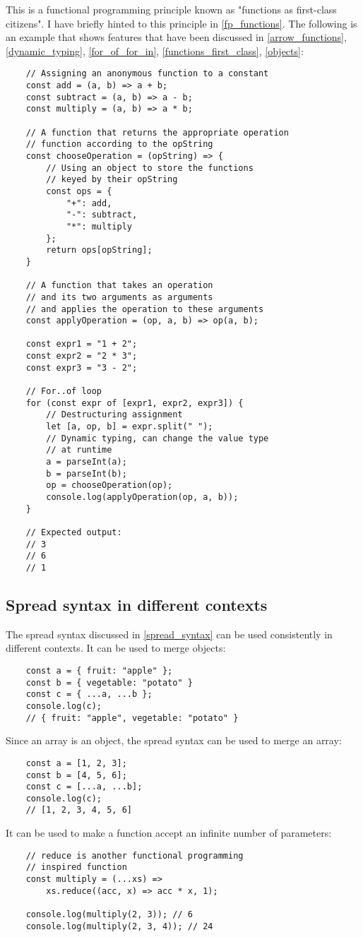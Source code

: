 \documentclass[11pt,a4paper]{article}
\begin{document}
This is a functional programming principle known as "functions as first-class citizens".
I have briefly hinted to this principle in \ref{fp_functions}.
The following is an example that shows features that have been discussed in
\ref{arrow_functions}, \ref{dynamic_typing}, \ref{for_of_for_in}, \ref{functions_first_class}, \ref{objects}:
\begin{verbatim}
    // Assigning an anonymous function to a constant
    const add = (a, b) => a + b;
    const subtract = (a, b) => a - b;
    const multiply = (a, b) => a * b;

    // A function that returns the appropriate operation
    // function according to the opString
    const chooseOperation = (opString) => {
        // Using an object to store the functions
        // keyed by their opString
        const ops = {
            "+": add,
            "-": subtract,
            "*": multiply
        };
        return ops[opString];
    }

    // A function that takes an operation
    // and its two arguments as arguments
    // and applies the operation to these arguments
    const applyOperation = (op, a, b) => op(a, b);

    const expr1 = "1 + 2";
    const expr2 = "2 * 3";
    const expr3 = "3 - 2";

    // For..of loop
    for (const expr of [expr1, expr2, expr3]) {
        // Destructuring assignment
        let [a, op, b] = expr.split(" ");
        // Dynamic typing, can change the value type
        // at runtime
        a = parseInt(a);
        b = parseInt(b);
        op = chooseOperation(op);
        console.log(applyOperation(op, a, b));
    }

    // Expected output:
    // 3
    // 6
    // 1
\end{verbatim}

\subsection{Spread syntax in different contexts}
The spread syntax discussed in \ref{spread_syntax} can be used consistently in different contexts.
It can be used to merge objects:
\begin{verbatim}
    const a = { fruit: "apple" };
    const b = { vegetable: "potato" }
    const c = { ...a, ...b };
    console.log(c);
    // { fruit: "apple", vegetable: "potato" }
\end{verbatim}
Since an array is an object, the spread syntax can be used to merge an array:
\begin{verbatim}
    const a = [1, 2, 3];
    const b = [4, 5, 6];
    const c = [...a, ...b];
    console.log(c);
    // [1, 2, 3, 4, 5, 6]
\end{verbatim}
It can be used to make a function accept an infinite number of parameters:
\begin{verbatim}
    // reduce is another functional programming
    // inspired function
    const multiply = (...xs) =>
        xs.reduce((acc, x) => acc * x, 1);

    console.log(multiply(2, 3)); // 6
    console.log(multiply(2, 3, 4)); // 24
\end{verbatim}
\end{document}
